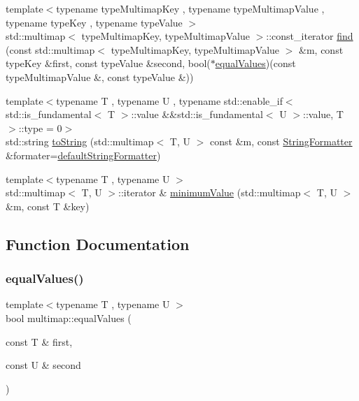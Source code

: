 \begin{DoxyCompactItemize}
\item 
{\footnotesize template$<$typename type\+Multimap\+Key , typename type\+Multimap\+Value , typename type\+Key , typename type\+Value $>$ }\\std\+::multimap$<$ type\+Multimap\+Key, type\+Multimap\+Value $>$\+::const\+\_\+iterator \hyperlink{namespacemultimap_ad8171701d0a623e4623721cb1743196c}{find} (const std\+::multimap$<$ type\+Multimap\+Key, type\+Multimap\+Value $>$ \&m, const type\+Key \&first, const type\+Value \&second, bool($\ast$\hyperlink{namespacemultimap_a68f763c0d3546ccd9cc14f5219559e08}{equal\+Values})(const type\+Multimap\+Value \&, const type\+Value \&))
\item 
{\footnotesize template$<$typename T , typename U , typename std\+::enable\+\_\+if$<$ std\+::is\+\_\+fundamental$<$ T $>$\+::value \&\&std\+::is\+\_\+fundamental$<$ U $>$\+::value, T $>$\+::type  = 0$>$ }\\std\+::string \hyperlink{namespacemultimap_aa170f94901a505969ecfa010c24f2877}{to\+String} (std\+::multimap$<$ T, U $>$ const \&m, const \hyperlink{classStringFormatter}{String\+Formatter} \&formater=\hyperlink{stringFormatter_8h_abf1349c8e24162d0134072aff288f2a2}{default\+String\+Formatter})
\item 
{\footnotesize template$<$typename T , typename U $>$ }\\std\+::multimap$<$ T, U $>$\+::iterator \& \hyperlink{namespacemultimap_a94c77f5e6ac9c4eaeb34a6c142b6ab0d}{minimum\+Value} (std\+::multimap$<$ T, U $>$ \&m, const T \&key)
\end{DoxyCompactItemize}


\subsection{Function Documentation}
\mbox{\label{namespacemultimap_a68f763c0d3546ccd9cc14f5219559e08}} 
\subsubsection{\texorpdfstring{equal\+Values()}{equalValues()}}
{\footnotesize\ttfamily template$<$typename T , typename U $>$ \\
bool multimap\+::equal\+Values (\begin{DoxyParamCaption}\item[{const T \&}]{first,  }\item[{const U \&}]{second }\end{DoxyParamCaption})}

